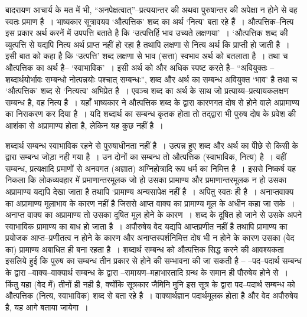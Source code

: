 बादरायण आचार्य के मत में भी, “अनपेक्षत्वात्”–प्रत्ययान्तर की अथवा पुरुषान्तर की अपेक्षा न होने से वह स्वतः प्रमाण है~। भाष्यकार सूत्रावयव ‘औत्पत्तिक' शब्द का अर्थ ‘नित्य' बता रहे हैं~। औत्पत्तिक–नित्य इस प्रकार अर्थ करनें में उपपत्ति बताते है कि ‘उत्पत्तिर्हि भाव उच्यते लक्षणया'~। ‘औत्पत्तिक शब्द की व्युत्पत्ति से यद्यपि नित्य अर्थ प्राप्त नहीं हो रहा है तथापि लक्षणा से नित्य अर्थ कि प्राप्ती हो जाती है~। इसी बात को कहा है कि ‘उत्पत्ति' शब्द लक्षणा से भाव (सत्ता) स्वभाव अर्थ को बतलाता है~। तथा च औत्पत्तिक का अर्थ है– ‘स्वाभाविक'~। इसी अर्थ को और अधिक स्पष्ट करते है– “अवियुक्तः – शब्दार्थयोर्भावः सम्बन्धो नोत्पन्नयोः पश्चात् सम्बन्धः”, शब्द और अर्थ का सम्बन्ध अवियुक्त ‘भाव' है तथा च ‘औत्पत्तिक' शब्द से ‘नित्यत्व' अभिप्रेत है~। एवञ्च शब्द का अर्थ के साथ जो प्रत्याय्य–प्रत्यायकलक्षण सम्बन्ध है, वह नित्य है~। यहाँ भाष्यकार ने औत्पत्तिक शब्द के द्वारा कारणगत दोष से होने वाले अप्रामाण्य का निराकरण कर दिया है~। यदि शब्दार्थ का सम्बन्ध कृतक होता तो तद्द्वारा भी पुरुष दोष के प्रवेश की आशंका से अप्रामाण्य होता है, लेकिन यह कुछ नहीं है~। 

शब्दार्थ सम्बन्ध स्वाभाविक रहने से पुरुषाधीनता नहीं है~। उत्पन्न हुए शब्द और अर्थ का पीेछे से किसी के द्वारा सम्बन्ध जोड़ा नही गया है~। उन दोनों का सम्बन्ध तो औत्पत्तिक (स्वाभाविक, नित्य) है~। वहीं सम्बन्ध, प्रत्यक्षादि प्रमाणों से अनवगत (अज्ञात) अग्निहोत्रादि रूप धर्म का निमित्त है~। इससे निष्कर्ष यह निकला कि लोकव्यवहार में प्रमाणान्तरमूलक जो हो उसका प्रामाण्य और प्रमाणान्तरमूलक न हो उसका अप्रामाण्य यद्यपि देखा जाता है तथापि ‘प्रामाण्य अन्यसापेक्ष नहीं है~। अपितु स्वतः ही है~। अनाप्तवाक्य का अप्रामाण्य मूलाभाव के कारण नहीं है जिससे आप्त वाक्य का प्रामाण्य मूल के अधीन कहा जा सके~। अनाप्त वाक्य का अप्रामाण्य तो उसका दूषित मूल होने के कारण~। शब्द के दूषित हो जाने से उसके अपने स्वाभाविक प्रामाण्य का बाध हो जाता है~। अपौरुषेय वेद यद्यपि आप्तप्रणीत नहीं है तथापि प्रामाण्य का प्रयोजक आप्त–प्रणीतत्व न होने के कारण और अनाप्तस्पर्शनिमित्त दोष भी न होने के कारण उसका (वेद का) प्रामाण्य अबाधित ही बना रहता है~। शब्दार्थ सम्बन्ध को औत्पत्तिक सिद्ध करने की आवश्यकता इसलिये हुई कि पुरुष का सम्बन्ध तीन प्रकार से होने की सम्भावना की जा सकती है – –पद–पदार्थ सम्बन्ध के द्वारा –वाक्य–वाक्यार्थ सम्बन्ध के द्वारा –रामायण–महाभारतादि ग्रन्थ के समान ही पौरुषेय होने से~। किंतु यहा (वेद में) तीनों ही नही है, क्योंकि सूत्रकार जैमिनि मुनि इस सूत्र के द्वारा पद–पदार्थ सम्बन्ध को औत्पत्तिक (नित्य, स्वाभाविक) शब्द से बता रहे है~। वाक्यार्थज्ञान पदार्थमूलक होता है और वेद अपौरुषेय है, यह आगे बताया जायेगा~। 

